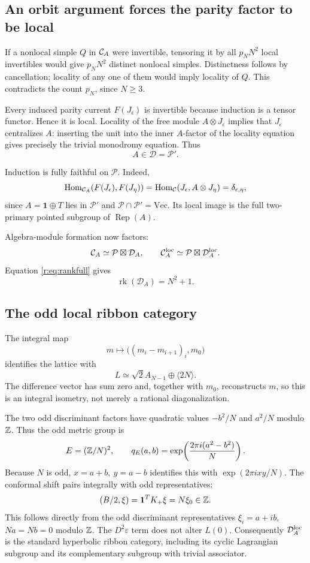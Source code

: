 \documentclass[11pt,a4paper]{article}
\numberwithin{equation}{section}
\theoremstyle{definition}\newtheorem{definition}[theorem]{Definition}
\theoremstyle{remark}\newtheorem{remark}[theorem]{Remark}
\newcommand{\one}{\mathbf1}\newcommand{\B}{\mathcal B}\newcommand{\W}{W_N}
\newcommand{\Hom}{\operatorname{Hom}}\newcommand{\End}{\operatorname{End}}
\newcommand{\Rep}{\operatorname{Rep}}\newcommand{\Ext}{\operatorname{Ext}}
\newcommand{\rk}{\operatorname{rk}}\newcommand{\Tr}{\operatorname{Tr}}
\newcommand{\Par}{\mathcal P}\newcommand{\Neu}{\mathcal D}
\newcommand{\eps}{\varepsilon}\newcommand{\NN}{\mathbb Z_{\geq0}}
\newcommand{\parityrank}{p_N}
\begin{document}
\subsection{An orbit argument forces the parity factor to be local}

If a nonlocal simple \(Q\) in \(\mathcal C_A\) were invertible, tensoring
it by all \(\parityrank N^2\) local invertibles would give \(\parityrank N^2\) distinct
nonlocal simples. Distinctness follows by cancellation; locality
of any one of them would imply locality of \(Q\). This contradicts
the count \(\parityrank\), since \(N\ge3\).

Every induced parity current \(F(J_\epsilon)\) is invertible
because induction is a tensor functor. Hence it is local.
Locality of the free module \(A\otimes J_\epsilon\) implies that
\(J_\epsilon\) centralizes \(A\): inserting the unit into the inner
\(A\)-factor of the locality equation gives precisely the trivial
monodromy equation. Thus
\begin{equation}\label{r:eq:central}
                              A\in\Neu=\Par'.
\end{equation}

Induction is fully faithful on \(\Par\). Indeed,
\[
 \Hom_{\Cat_A}(F(J_\epsilon),F(J_\eta))
   =\Hom_{\Cat}(J_\epsilon,A\otimes J_\eta)
   =\delta_{\epsilon,\eta},
\]
since \(A=\one\oplus T\) lies in \(\Par'\) and
\(\Par\cap\Par'=\mathrm{Vec}\). Its local image is the full
two-primary pointed subgroup of \(\Rep(A)\).

Algebra-module formation now factors:
\[
 \Cat_A\simeq\Par\boxtimes\Neu_A,\qquad
 \Cat_A^{\loc}\simeq\Par\boxtimes\Neu_A^{\loc}.
\]
Equation \eqref{r:eq:rankfull} gives
\begin{equation}\label{r:eq:rankneutral}
                    \rk(\Neu_A)=N^2+1.
\end{equation}

\subsection{The odd local ribbon category}

The integral map
\[
 m\longmapsto\bigl((m_i-m_{i+1})_i,m_0\bigr)
\]
identifies the lattice with
\[
                  L\simeq \sqrt2 A_{N-1}\oplus\langle2N\rangle.
\]
The difference vector has sum zero and, together with \(m_0\),
reconstructs \(m\), so this is an integral isometry, not merely a
rational diagonalization.

The two odd discriminant factors have quadratic values
\(-b^2/N\) and \(a^2/N\) modulo \(\mathbb Z\). Thus the odd metric group is
\[
 E=(\mathbb Z/N)^2,\qquad
 q_E(a,b)=\exp\!\left(\frac{2\pi i(a^2-b^2)}N\right).
\]
Because \(N\) is odd, \(x=a+b,\ y=a-b\) identifies this with
\(\exp(2\pi ixy/N)\).
The conformal shift pairs integrally with odd representatives:
\[
             (B/2,\xi)=\one^TK_+\xi=N\xi_0\in\Z.
\]
This follows directly from the odd discriminant representatives
\(\xi_i=a+ib\), \(Na=Nb=0\) modulo \(\mathbb Z\).
The \(D^2\eps\) term does not alter \(L(0)\).
Consequently \(\Neu_A^{\loc}\) is the standard hyperbolic
ribbon category, including its cyclic Lagrangian subgroup and its
complementary subgroup with trivial associator.
\end{document}
